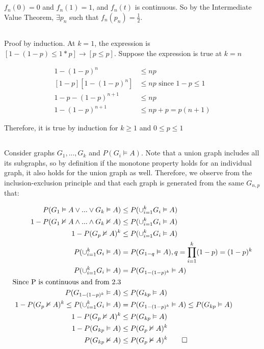 \documentclass{article}
\begin{document}
\subsection{}
$f_n(0) = 0$ and $f_n(1) = 1$, and $f_n(t)$ is continuous. So by the Intermediate Value Theorem, $\exists p_n$ such that $f_n(p_n) = \frac{1}{2}$.

\subsection{}
Proof by induction. At $k = 1$, the expression is $[1-(1-p) \le 1*p] \rightarrow [p \le p]$. Suppose the expression is true at $k = n$

\begin{align*}
1-(1-p)^n &\le np\\
[1-p][1-(1-p)^n]&\le np\text{ since $1-p\le 1$}\\
1-p-(1-p)^{n+1}&\le np\\
1-(1-p)^{n+1}&\le np+p=p(n+1)
\end{align*}

Therefore, it is true by induction for $k\ge 1$ and $0\le p\le 1$

\subsection{}
Consider graphs $G_1,...,G_k$ and $P(G_i\vDash A)$. Note that a union graph includes all its subgraphs, so by definition if the monotone property holds for an individual graph, it also holds for the union graph as well. Therefore, we observe from the inclusion-exclusion principle and that each graph is generated from the same $G_{n,p}$ that:

\begin{align*}
P(G_1\vDash A \vee ... \vee G_k\vDash A)&\le P(\cup_{i=1}^k G_i\vDash A)\\
1-P(G_1\nvDash A \wedge ... \wedge G_k\nvDash A)&\le P(\cup_{i=1}^k G_i\vDash A)\\
1-P(G_p\nvDash A)^k&\le P(\cup_{i=1}^k G_i\vDash A)\\
P(\cup_{i=1}^kG_i\vDash A)&=P(G_{1-q}\vDash A), q=\prod_{i=1}^k(1-p)=(1-p)^k\\
P(\cup_{i=1}^kG_i\vDash A)&=P(G_{1-(1-p)^k}\vDash A)\\
\text{Since P is continuous and from 2.3}\\
P(G_{1-(1-p)^k}\vDash A)&\le P(G_{kp}\vDash A)\\
1-P(G_p\nvDash A)^k\le P(\cup_{i=1}^k G_i\vDash A)&=P(G_{1-(1-p)^k}\vDash A)\le P(G_{kp}\vDash A)\\
1-P(G_p\nvDash A)^k&\le P(G_{kp}\vDash A)\\
1-P(G_{kp}\vDash A)&\le P(G_p\nvDash A)^k\\
P(G_{kp}\nvDash A)&\le P(G_p\nvDash A)^k\qed \\
\end{align*}
\end{document}
